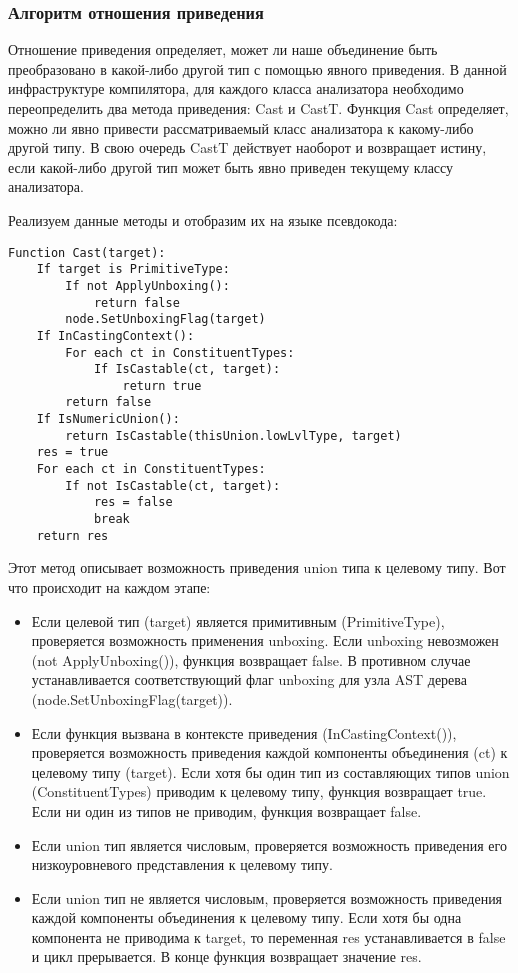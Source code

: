 \subsubsection{Алгоритм отношения приведения}

Отношение приведения определяет, может ли наше объединение быть преобразовано в какой-либо другой тип с помощью
явного приведения.
В данной инфраструктуре компилятора, для каждого класса анализатора необходимо переопределить два метода приведения:
Cast и CastT\@.
Функция Cast определяет, можно ли явно привести рассматриваемый класс анализатора к какому-либо другой типу.
В свою очередь CastT действует наоборот и возвращает истину, если какой-либо другой тип может быть явно приведен
текущему классу анализатора.

Реализуем данные методы и отобразим их на языке псевдокода:

\begin{lstlisting}[label={lst:casttarget}]
Function Cast(target):
    If target is PrimitiveType:
        If not ApplyUnboxing():
            return false
        node.SetUnboxingFlag(target)
    If InCastingContext():
        For each ct in ConstituentTypes:
            If IsCastable(ct, target):
                return true
        return false
    If IsNumericUnion():
        return IsCastable(thisUnion.lowLvlType, target)
    res = true
    For each ct in ConstituentTypes:
        If not IsCastable(ct, target):
            res = false
            break
    return res
\end{lstlisting}

Этот метод описывает возможность приведения union типа к целевому типу.
Вот что происходит на каждом этапе:

\begin{itemize}[left=2em]
    \item Если целевой тип (target) является примитивным (PrimitiveType), проверяется возможность применения unboxing.
    Если unboxing невозможен (not ApplyUnboxing()), функция возвращает false.
    В противном случае устанавливается соответствующий флаг unboxing для узла AST дерева (node.SetUnboxingFlag(target)).
    \item Если функция вызвана в контексте приведения (InCastingContext()), проверяется возможность приведения
    каждой компоненты объединения (ct) к целевому типу (target).
    Если хотя бы один тип из составляющих типов union (ConstituentTypes) приводим к целевому типу, функция возвращает true.
    Если ни один из типов не приводим, функция возвращает false.
    \item Если union тип является числовым, проверяется возможность приведения его низкоуровневого представления к
    целевому типу.
    \item Если union тип не является числовым, проверяется возможность приведения каждой компоненты объединения
    к целевому типу.
    Если хотя бы одна компонента не приводима к target, то переменная res устанавливается в false и цикл прерывается.
    В конце функция возвращает значение res.
\end{itemize}

